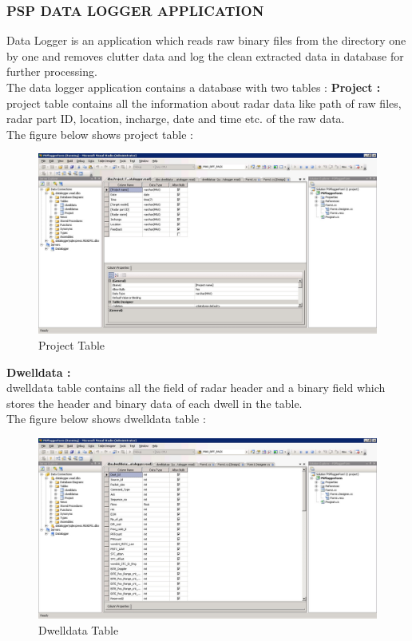 \documentclass[14pt]{article} %
\begin{document}
\subsubsection{PSP DATA LOGGER APPLICATION}
\noindent Data Logger is an application which reads raw binary files from the directory one by one and removes clutter data and log the clean extracted data in database for further processing.\\
The data logger application contains a database with two tables :
\newline
\noindent \textbf{Project :}\\
project table contains all the information about radar data like path of raw files, radar part ID, location, incharge, date and time etc. of the raw data.\\
The figure below shows project table :
 \begin{figure}[H]
   \includegraphics[width=\linewidth]{Project_table.jpg}
  \caption{Project Table}
  \label{fig:figure 15}
\end{figure}
\noindent \textbf{Dwelldata :}\\
dwelldata table contains all the field of radar header and a binary field which stores the header and binary data of each dwell in the table. \\
The figure below shows dwelldata table :
\begin{figure}[H]
\includegraphics[width=\linewidth]{database_table.jpg}
  \caption{Dwelldata Table}
  \label{fig:figure 16}
\end{figure}
\end{document}

